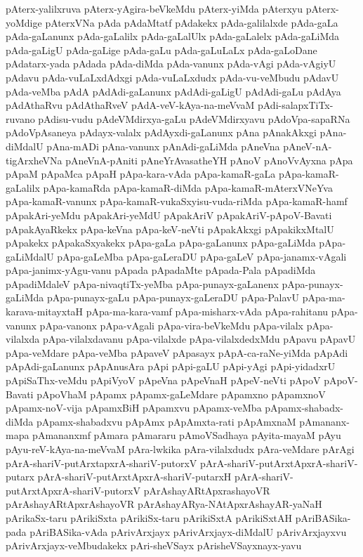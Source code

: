 {pAterx-yalilxruva
pAterx-yAgira-beVkeMdu
pAterx-yiMda
pAterxyu
pAterx-yoMdige
pAterxVNa
pAda
pAdaMtatf
pAdakekx
pAda-galilalxde
pAda-gaLa
pAda-gaLanunx
pAda-gaLalilx
pAda-gaLalUlx
pAda-gaLalelx
pAda-gaLiMda
pAda-gaLigU
pAda-gaLige
pAda-gaLu
pAda-gaLuLaLx
pAda-gaLoDane
pAdatarx-yada
pAdada
pAda-diMda
pAda-vanunx
pAda-vAgi
pAda-vAgiyU
pAdavu
pAda-vuLaLxdAdxgi
pAda-vuLaLxdudx
pAda-vu-veMbudu
pAdavU
pAda-veMba
pAdA
pAdAdi-gaLanunx
pAdAdi-gaLigU
pAdAdi-gaLu
pAdAya
pAdAthaRvu
pAdAthaRveV
pAdA-veV-kAya-na-meVvaM
pAdi-salapxTiTx-ruvano
pAdisu-vudu
pAdeVMdirxya-gaLu
pAdeVMdirxyavu
pAdoVpa-sapaRNa
pAdoVpAsaneya
pAdayx-valalx
pAdAyxdi-gaLanunx
pAna
pAnakAkxgi
pAna-diMdalU
pAna-mADi
pAna-vanunx
pAnAdi-gaLiMda
pAneVna
pAneV-nA-tigArxheVNa
pAneVnA-pAniti
pAneYrAvasatheYH
pAnoV
pAnoVvAyxna
pApa
pApaM
pApaMca
pApaH
pApa-kara-vAda
pApa-kamaR-gaLa
pApa-kamaR-gaLalilx
pApa-kamaRda
pApa-kamaR-diMda
pApa-kamaR-mAterxVNeYva
pApa-kamaR-vanunx
pApa-kamaR-vukaSxyisu-vuda-riMda
pApa-kamaR-hamf
pApakAri-yeMdu
pApakAri-yeMdU
pApakAriV
pApakAriV-pApoV-Bavati
pApakAyaRkekx
pApa-keVna
pApa-keV-neVti
pApakAkxgi
pApakikxMtalU
pApakekx
pApakaSxyakekx
pApa-gaLa
pApa-gaLanunx
pApa-gaLiMda
pApa-gaLiMdalU
pApa-gaLeMba
pApa-gaLeraDU
pApa-gaLeV
pApa-janamx-vAgali
pApa-janimx-yAgu-vanu
pApada
pApadaMte
pApada-Pala
pApadiMda
pApadiMdaleV
pApa-nivaqtiTx-yeMba
pApa-punayx-gaLanenx
pApa-punayx-gaLiMda
pApa-punayx-gaLu
pApa-punayx-gaLeraDU
pApa-PalavU
pApa-ma-karava-mitayxtaH
pApa-ma-kara-vamf
pApa-misharx-vAda
pApa-rahitanu
pApa-vanunx
pApa-vanonx
pApa-vAgali
pApa-vira-beVkeMdu
pApa-vilalx
pApa-vilalxda
pApa-vilalxdavanu
pApa-vilalxde
pApa-vilalxdedxMdu
pApavu
pApavU
pApa-veMdare
pApa-veMba
pApaveV
pApasayx
pApA-ca-raNe-yiMda
pApAdi
pApAdi-gaLanunx
pApAnusAra
pApi
pApi-gaLU
pApi-yAgi
pApi-yidadxrU
pApiSaThx-veMdu
pApiVyoV
pApeVna
pApeVnaH
pApeV-neVti
pApoV
pApoV-Bavati
pApoVhaM
pApamx
pApamx-gaLeMdare
pApamxno
pApamxnoV
pApamx-noV-vija
pApamxBiH
pApamxvu
pApamx-veMba
pApamx-shabadx-diMda
pApamx-shabadxvu
pApAmx
pApAmxta-rati
pApAmxnaM
pAmananx-mapa
pAmananxmf
pAmara
pAmararu
pAmoVSadhaya
pAyita-mayaM
pAyu
pAyu-reV-kAya-na-meVvaM
pAra-lwkika
pAra-vilalxdudx
pAra-veMdare
pArAgi
pArA-shariV-putArxtapxrA-shariV-putorxV
pArA-shariV-putArxtApxrA-shariV-putarx
pArA-shariV-putArxtApxrA-shariV-putarxH
pArA-shariV-putArxtApxrA-shariV-putorxV
pArAshayARtApxrashayoVR
pArAshayARtApxrAshayoVR
pArAshayARya-NAtApxrAshayAR-yaNaH
pArikaSx-taru
pArikiSxta
pArikiSx-taru
pArikiSxtA
pArikiSxtAH
pAriBASika-pada
pAriBASika-vAda
pArivArxjayx
pArivArxjayx-diMdalU
pArivArxjayxvu
pArivArxjayx-veMbudakekx
pAri-sheVSayx
pArisheVSayxnayx-yavu
}
